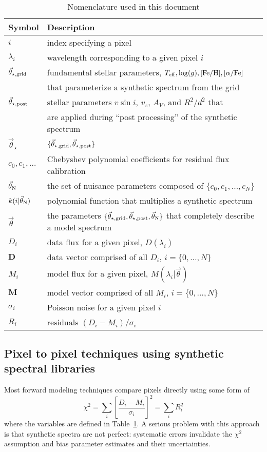 \documentclass[preprint]{aastex} %
\newcommand{\vt}{\vec{\theta}}
\newcommand{\vg}{\vt_{\star, {\rm grid}}}
\newcommand{\vpp}{\vt_{\star, {\rm post}}}
\newcommand{\vstar}{\vt_{\star}}
\newcommand{\vN}{\vt_{\rm N}}
\newcommand{\fM}{ {\bm M}}
\newcommand{\fMi}{M_i}
\newcommand{\fD}{ {\bm D}}
\newcommand{\fDi}{D_i}
\newcommand{\Z}{[{\rm Fe}/{\rm H}]}
\newcommand{\A}{[\alpha/{\rm Fe}]}
\begin{document}
\begin{table}[!htb]
\begin{tabular}{ll}
\hline
\hline
Symbol & Description\\
\hline
\hline
$i$ & index specifying a pixel\\
$\lambda_i$ & wavelength corresponding to a given pixel $i$\\
$\vg$ & fundamental stellar parameters, $T_{\rm eff}, \log(g), \Z, \A$\\
  & that parameterize a synthetic spectrum from the grid\\
$\vpp$ & stellar parameters $v \sin i$, $v_z$, $A_V$, and $R^2/d^2$ that\\
  & are applied during ``post processing'' of the synthetic spectrum\\
$\vstar$ & $\{\vg,\vpp \}$\\
$c_0, c_1, \ldots$ & Chebyshev polynomial coefficients for residual flux calibration\\
$\vN$ & the set of nuisance parameters composed of $\{c_0, c_1, \ldots, c_N\}$\\
$k(i | \vN)$  & polynomial function that multiplies a synthetic spectrum\\
$\vt$ & the parameters $\{\vg, \vpp, \vN\}$ that completely describe a model spectrum\\
$\fDi$ & data flux for a given pixel, $D(\lambda_i)$\\
$\fD$ & data vector comprised of all $\fDi$, $i = \{0, \ldots, N\}$\\
$\fMi$ & model flux for a given pixel, $M(\lambda_i | \vt)$\\
$\fM$ & model vector comprised of all $\fMi$, $i = \{0, \ldots, N\}$\\
$\sigma_i$ & Poisson noise for a given pixel $i$\\
$R_i$ & residuals $(\fDi - \fMi)/\sigma_i$\\
\hline
\end{tabular}
\caption{Nomenclature used in this document}
\label{tab:nomenclature}
\end{table}

\subsection{Pixel to pixel techniques using synthetic spectral libraries}
\label{sec:pix}
Most forward modeling techniques compare pixels directly using some form of
\begin{equation}
  \chi^2 = \sum_i \left [\frac{ \fDi - \fMi}{\sigma_i} \right ]^2 = \sum_i R_i^2
\end{equation}
where the variables are defined in Table~\ref{tab:nomenclature}. A serious problem with this approach is that synthetic spectra are not perfect: systematic errors invalidate the $\chi^2$ assumption and bias parameter estimates and their uncertainties.
\end{document}
